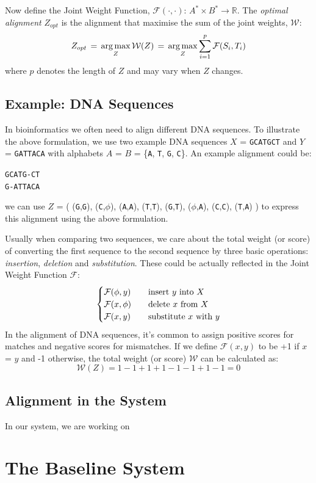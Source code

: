 Now define the Joint Weight Function, $\mathcal{F}(\cdot,\cdot)$: $A^* \times B^* \to \mathbb{R}$. The \textit{optimal alignment} $Z_{opt}$ is the alignment that maximise the sum of the joint weights, $\mathcal{W}$:
\begin{equation}
  Z_{opt} \,=\, \operatorname*{arg\,max}_{Z} \mathcal{W}(Z) \,=\, \operatorname*{arg\,max}_{Z} \sum_{i=1}^{p} \mathcal{F}(S_i,T_i)
\end{equation}
where $p$ denotes the length of $Z$ and may vary when $Z$ changes.

\subsection{Example: DNA Sequences}

In bioinformatics we often need to align different DNA sequences. To illustrate the above formulation, we use two example DNA sequences $X$ = \texttt{GCATGCT} and $Y$ = \texttt{GATTACA} with alphabets $A$ = $B$ = \{\texttt{A}, \texttt{T}, \texttt{G}, \texttt{C}\}. An example alignment could be:
\begin{center}
  \texttt{GCATG-CT}\\
  \texttt{G-ATTACA}
\end{center}
we can use $Z$ = (
  (\texttt{G},\texttt{G}),
  (\texttt{C},$\phi$),
  (\texttt{A},\texttt{A}),
  (\texttt{T},\texttt{T}),
  (\texttt{G},\texttt{T}),
  ($\phi$,\texttt{A}),
  (\texttt{C},\texttt{C}),
  (\texttt{T},\texttt{A})
) to express this alignment using the above formulation.

Usually when comparing two sequences, we care about the total weight (or score) of converting the first sequence to the second sequence by three basic operations: \textit{insertion}, \textit{deletion} and \textit{substitution}. These could be actually reflected in the Joint Weight Function $\mathcal{F}$:
\[
  \begin{cases}
    \mathcal{F}(\phi,y) & \text{\quad insert } y \text{ into } X \\
    \mathcal{F}(x,\phi) & \text{\quad delete } x \text{ from } X \\
    \mathcal{F}(x,y) & \text{\quad substitute } x \text{ with } y
  \end{cases}
\]
In the alignment of DNA sequences, it's common to assign positive scores for matches and negative scores for mismatches. If we define $\mathcal{F}(x,y)$ to be +1 if $x$ = $y$ and -1 otherwise, the total weight (or score) $\mathcal{W}$ can be calculated as:
\[ \mathcal{W}(Z) = 1 - 1 + 1 + 1 - 1 - 1 + 1 - 1 = 0 \]

\subsection{Alignment in the System}

In our system, we are working on 

\section{The Baseline System}



